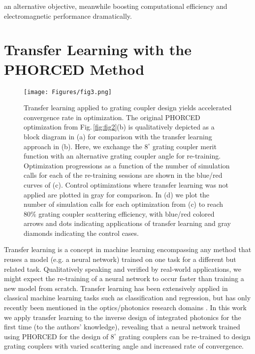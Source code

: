 \documentclass{article}
\begin{document}
an alternative objective, meanwhile boosting computational efficiency and electromagnetic performance dramatically.



\section{Transfer Learning with the PHORCED Method}
\label{sec:TL}

\begin{figure}[t!]
	\centering
	\texttt{[image: Figures/fig3.png]}
	\caption{Transfer learning applied to grating coupler design yields accelerated convergence rate in optimization. The original PHORCED optimization from Fig.\,\ref{fig:fig2}(b) is qualitatively depicted as a block diagram in (a) for comparison with the transfer learning approach in (b). Here, we exchange the $8^\circ$ grating coupler merit function with an alternative grating coupler angle for re-training. Optimization progressions as a function of the number of simulation calls for each of the re-training sessions are shown in the blue/red curves of (c). Control optimizations where transfer learning was not applied are plotted in gray for comparison. In (d) we plot the number of simulation calls for each optimization from (c) to reach 80\% grating coupler scattering efficiency, with blue/red colored arrows and dots indicating applications of transfer learning and gray diamonds indicating the control cases.}
	\label{fig:fig3}
\end{figure}

Transfer learning is a concept in machine learning encompassing any method that reuses a model (e.g. a neural network) trained on one task for a different but related task. Qualitatively speaking and verified by real-world applications, we might expect the re-training of a neural network to occur faster than training a new model from scratch. Transfer learning has been extensively applied in classical machine learning tasks such as classification and regression, but has only recently been mentioned in the optics/photonics research domains \cite{qu_migrating_2019, jiang_deep_2020, hegde_deep_2020, ma_deep_2021}.  In this work we apply transfer learning to the inverse design of integrated photonics for the first time (to the authors' knowledge), revealing that a neural network trained using PHORCED for the design of $8^\circ$ grating couplers can be re-trained to design grating couplers with varied scattering angle and increased rate of convergence. %
\end{document}
